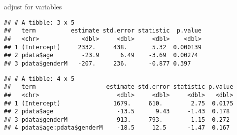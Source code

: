 \documentclass[]{article}
\newenvironment{Shaded}{\begin{snugshade}}{\end{snugshade}}
\newcommand{\KeywordTok}[1]{\textcolor[rgb]{0.13,0.29,0.53}{\textbf{#1}}}
\newcommand{\DataTypeTok}[1]{\textcolor[rgb]{0.13,0.29,0.53}{#1}}
\newcommand{\DecValTok}[1]{\textcolor[rgb]{0.00,0.00,0.81}{#1}}
\newcommand{\StringTok}[1]{\textcolor[rgb]{0.31,0.60,0.02}{#1}}
\newcommand{\OperatorTok}[1]{\textcolor[rgb]{0.81,0.36,0.00}{\textbf{#1}}}
\newcommand{\NormalTok}[1]{#1}
\begin{document}
adjust for variables

\begin{Shaded}
\end{Shaded}

\begin{verbatim}
## # A tibble: 3 x 5
##   term          estimate std.error statistic  p.value
##   <chr>            <dbl>     <dbl>     <dbl>    <dbl>
## 1 (Intercept)     2332.     438.       5.32  0.000139
## 2 pdata$age        -23.9      6.49    -3.69  0.00274 
## 3 pdata$genderM   -207.     236.      -0.877 0.397
\end{verbatim}

\begin{Shaded}
\end{Shaded}

\begin{verbatim}
## # A tibble: 4 x 5
##   term                    estimate std.error statistic p.value
##   <chr>                      <dbl>     <dbl>     <dbl>   <dbl>
## 1 (Intercept)               1679.     610.        2.75  0.0175
## 2 pdata$age                  -13.5      9.43     -1.43  0.178 
## 3 pdata$genderM              913.     793.        1.15  0.272 
## 4 pdata$age:pdata$genderM    -18.5     12.5      -1.47  0.167
\end{verbatim}

\begin{Shaded}
\end{Shaded}
\end{document}
